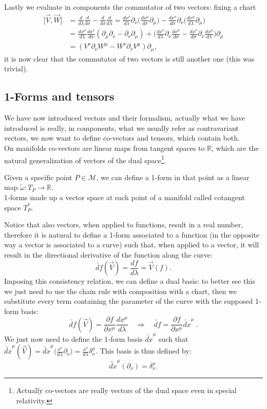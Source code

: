 Lastly we evaluate in components the commutator of two vectors: fixing a chart
\begin{align*}
	\big[\vec V,\vec W\big]&=\frac{d}{d\lambda}\frac{d}{d\sigma}-\frac{d}{d\sigma} \frac{d}{d\lambda}=\frac{dx^\nu}{d\lambda}\partial_\nu\bigg(\frac{dx^\mu}{d\sigma}\partial_\mu\bigg)-\frac{dx^\nu}{d\sigma}\partial_\nu\bigg(\frac{dx^\mu}{d\lambda}\partial_\mu\bigg)\\&=\frac{dx^\mu}{d\lambda}\frac{dx^\nu}{d\sigma}(\partial_\mu\partial_\nu-\partial_\nu\partial_\mu)+\bigg(\frac{dx^\nu}{d\lambda}\partial_\nu\frac{dx^\mu}{d\sigma}-\frac{dx^\nu}{d\sigma}\partial_\nu\frac{dx^\mu}{d\lambda}\bigg)\partial_\mu\\&=(V^\nu\partial_\nu W^\mu-W^\nu\partial_\nu V^\mu)\partial_\mu,
\end{align*}
it is now clear that the commutator of two vectors is still another one (this was trivial).
\subsection{1-Forms and tensors}
We have now introduced vectors and their formalism, actually what we have introduced is really, in components, what we usually refer as contravariant vectors, we now want to define co-vectors and tensors, which contain both.\\
On manifolds co-vectors are linear maps from tangent spaces to $\mathbb{R} $, which are the natural generalization of vectors of the dual space\footnote{Actually co-vectors are really vectors of the dual space even in special relativity.}.
\begin{defin}[1-forms]
	Given a specific point $P\in\mathcal{M}$, we can define a 1-form in that point as a linear map $\tilde{\omega}:T_P\rightarrow\mathbb{R}$.\\ 1-forms made up a vector space at each point of a manifold called cotangent space $T^*_P$.
\end{defin}
Notice that also vectors, when applied to functions, result in a real number, therefore it is natural to define a 1-form associated to a function (in the opposite way a vector is associated to a curve) such that, when applied to a vector, it will result in the directional derivative of the function along the curve:
$$\tilde{df}(\vec V)=\frac{df}{d\lambda}=\vec V(f).$$
Imposing this consistency relation, we can define a dual basis: to better see this we just need to use the chain rule with composition with a chart, then we substitute every term containing the parameter of the curve with the supposed 1-form basis:
$$\tilde{df}(\vec V)=\frac{\partial f}{\partial x^\mu}\frac{dx^\mu}{d\lambda}\quad\Rightarrow\quad\boxed{\tilde{df}=\frac{\partial f}{\partial x^\mu}\tilde{dx}^\mu}\ .$$
We just now need to define the 1-form basis $\tilde{dx}^\mu$ such that $\tilde{dx}^\mu(\vec V)=\tilde{dx}^\mu\big(\frac{x^\nu}{d\lambda}\partial_\nu\big)=\frac{x^\nu}{d\lambda}\delta^\mu_\nu$. This basis is thus defined by:
$$\boxed{\tilde{dx}^\mu(\partial_\nu)=\delta^\mu_\nu}.$$

